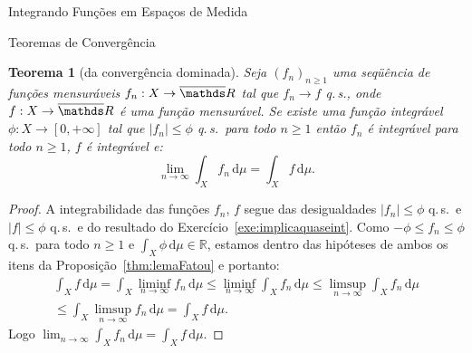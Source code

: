 \documentclass[oneside,final,11pt]{amsbook}
\newcommand{\R}{\mathds R}
\newcommand{\dd}{\mathrm d}
\newcommand{\qs}{\hbox{q.$\,$s.}}
\theoremstyle{remark}\newtheorem{exercise}{Exercício}[chapter]
\theoremstyle{remark}\newtheorem{*exercise}[exercise]{\hbox to 0pt{\hskip 0pt minus 1fil*}Exercício}
\theoremstyle{definition}\newtheorem{exdefin}{Definição}[chapter]
\theoremstyle{plain}\newtheorem{teo}{Teorema}[section]
\theoremstyle{plain}\newtheorem{lem}[teo]{Lema}
\theoremstyle{plain}\newtheorem{prop}[teo]{Proposição}
\theoremstyle{plain}\newtheorem{cor}[teo]{Corolário}
\theoremstyle{definition}\newtheorem{defin}[teo]{Definição}
\theoremstyle{remark}\newtheorem{rem}[teo]{Observação}
\theoremstyle{definition}\newtheorem{notation}[teo]{Notação}
\theoremstyle{definition}\newtheorem{convention}[teo]{Convenção}
\theoremstyle{definition}\newtheorem{example}[teo]{Exemplo}
\numberwithin{section}{chapter}
\numberwithin{equation}{section}
\begin{document}
\begin{chapter}{Integrando Funções em Espaços de Medida}
\begin{section}{Teoremas de Convergência}
\begin{teo}[da convergência dominada]\label{thm:convdominada}
%
Seja $(f_n)_{n\ge1}$ uma se\-qüên\-cia de funções mensuráveis $f_n:X\to\overline\R$ tal que $f_n\to f$ \qs, onde $f:X\to\overline\R$
é uma função mensurável. Se existe uma função integrável $\phi:X\to[0,+\infty]$ tal que $\vert f_n\vert\le\phi$ \qs\ para
todo $n\ge1$ então $f_n$ é integrável para todo $n\ge1$, $f$ é integrável e:
\[\lim_{n\to\infty}\int_Xf_n\,\dd\mu=\int_Xf\,\dd\mu.\]
\end{teo}
\begin{proof}
A integrabilidade das funções $f_n$, $f$ segue das desigualdades $\vert f_n\vert\le\phi$ \qs\ e $\vert f\vert\le\phi$ \qs\ e
do resultado do Exercício~\ref{exe:implicaquaseint}. Como $-\phi\le f_n\le\phi$ \qs\ para todo $n\ge1$
e $\int_X\phi\,\dd\mu\in\R$, estamos dentro das hipóteses de ambos os itens da Proposição~\ref{thm:lemaFatou} e portanto:
\begin{multline*}
\int_Xf\,\dd\mu=\int_X\liminf_{n\to\infty}f_n\,\dd\mu\le\liminf_{n\to\infty}\int_Xf_n\,\dd\mu
\le\limsup_{n\to\infty}\int_Xf_n\,\dd\mu\\
\le\int_X\limsup_{n\to\infty}f_n\,\dd\mu=\int_Xf\,\dd\mu.
\end{multline*}
Logo $\lim_{n\to\infty}\int_Xf_n\,\dd\mu=\int_Xf\,\dd\mu$.
\end{proof}


\end{section}
\end{chapter}
\end{document}
